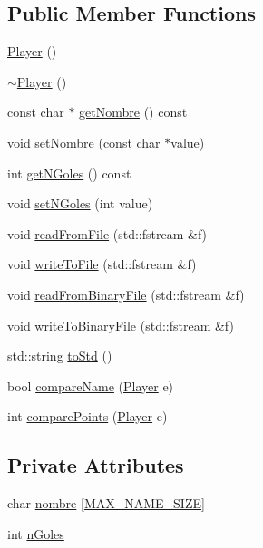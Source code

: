 \subsection*{Public Member Functions}
\begin{DoxyCompactItemize}
\item 
\hyperlink{class_player_affe0cc3cb714f6deb4e62f0c0d3f1fd8}{Player} ()
\item 
\hyperlink{class_player_a749d2c00e1fe0f5c2746f7505a58c062}{$\sim$\+Player} ()
\item 
const char $\ast$ \hyperlink{class_player_a2431f338e500ad5a513862cb4f0ee5e6}{get\+Nombre} () const 
\item 
void \hyperlink{class_player_a3c26ab31dffaf71b9775459ae00e1735}{set\+Nombre} (const char $\ast$value)
\item 
int \hyperlink{class_player_a8cbb574ef5d289cf71cb0fa446049401}{get\+N\+Goles} () const 
\item 
void \hyperlink{class_player_aeaa23561cac2c75d1f3cad94915f0835}{set\+N\+Goles} (int value)
\item 
void \hyperlink{class_player_a5088f4e4cd406d48b6564cc34753895b}{read\+From\+File} (std\+::fstream \&f)
\item 
void \hyperlink{class_player_a9877e43a40bba2e2e2acae6e1d992363}{write\+To\+File} (std\+::fstream \&f)
\item 
void \hyperlink{class_player_ab7038bb788b388bf53c3341b323c3cc2}{read\+From\+Binary\+File} (std\+::fstream \&f)
\item 
void \hyperlink{class_player_a31dd259f308c9b46521e52a6b3440833}{write\+To\+Binary\+File} (std\+::fstream \&f)
\item 
std\+::string \hyperlink{class_player_a6d3beea7580a4b7b4c8b80feac3351d3}{to\+Std} ()
\item 
bool \hyperlink{class_player_afbef46d6a1798c9aca92e7f6668b7b67}{compare\+Name} (\hyperlink{class_player}{Player} e)
\item 
int \hyperlink{class_player_aab6b943cff330f13e93e24f3ed960eff}{compare\+Points} (\hyperlink{class_player}{Player} e)
\end{DoxyCompactItemize}
\subsection*{Private Attributes}
\begin{DoxyCompactItemize}
\item 
char \hyperlink{class_player_ab95c5a516b98e3598501ae98a0ff7cbc}{nombre} \mbox{[}\hyperlink{player_8h_abdc276a3da6aba2279ae3e4a69731d9f}{M\+A\+X\+\_\+\+N\+A\+M\+E\+\_\+\+S\+I\+Z\+E}\mbox{]}
\item 
int \hyperlink{class_player_af88db85f6586777613d378e8661fb8f7}{n\+Goles}
\end{DoxyCompactItemize}


